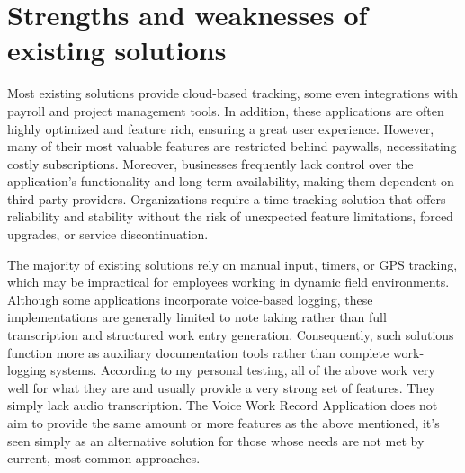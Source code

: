 \documentclass[
  digital,     %
  oneside,     %
  nosansbold,  %
  nocolorbold, %
  lof,         %
  lot,         %
]{fithesis4}
\begin{document}
\section{Strengths and weaknesses of existing solutions}

Most existing solutions provide cloud-based tracking, some even integrations with payroll and project management tools. In addition, these applications are often highly optimized and feature rich, ensuring a great user experience. However, many of their most valuable features are restricted behind paywalls, necessitating costly subscriptions. Moreover, businesses frequently lack control over the application's functionality and long-term availability, making them dependent on third-party providers. Organizations require a time-tracking solution that offers reliability and stability without the risk of unexpected feature limitations, forced upgrades, or service discontinuation. 

The majority of existing solutions rely on manual input, timers, or GPS tracking, which may be impractical for employees working in dynamic field environments. Although some applications incorporate voice-based logging, these implementations are generally limited to note taking rather than full transcription and structured work entry generation. Consequently, such solutions function more as auxiliary documentation tools rather than complete work-logging systems. According to my personal testing, all of the above work very well for what they are and usually provide a very strong set of features. They simply lack audio transcription. The Voice Work Record Application does not aim to provide the same amount or more features as the above mentioned, it's seen simply as an alternative solution for those whose needs are not met by current, most common approaches.
\end{document}
